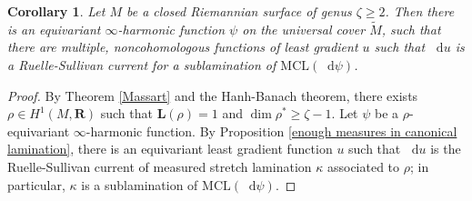 \documentclass[reqno,11pt]{amsart}
\newcommand{\RR}{\mathbf{R}}
\newcommand{\Sph}{\mathbf S}
\newcommand*\dif{\mathop{}\!\mathrm{d}}
\newcommand{\vol}{\mathrm{vol}}
\newcommand{\MCL}{\mathrm{MCL}}
\newcommand{\Mass}{\mathbf M}
\newcommand{\Comass}{\mathbf L}
\newtheorem{corollary}[theorem]{Corollary}
\theoremstyle{definition}
\numberwithin{equation}{section}
\begin{document}
\begin{corollary}
Let $M$ be a closed Riemannian surface of genus $\zeta \geq 2$.
Then there is an equivariant $\infty$-harmonic function $\psi$ on the universal cover $\tilde M$, such that there are multiple, noncohomologous functions of least gradient $u$ such that $\dif u$ is a Ruelle-Sullivan current for a sublamination of $\MCL(\dif \psi)$.
\end{corollary}
\begin{proof}
By Theorem \ref{Massart} and the Hanh-Banach theorem, there exists $\rho \in H^1(M, \RR)$ such that $\Comass(\rho) = 1$ and $\dim \rho^* \geq \zeta - 1$.
Let $\psi$ be a $\rho$-equivariant $\infty$-harmonic function.
By Proposition \ref{enough measures in canonical lamination}, there is an equivariant least gradient function $u$ such that $\dif u$ is the Ruelle-Sullivan current of measured stretch lamination $\kappa$ associated to $\rho$; in particular, $\kappa$ is a sublamination of $\MCL(\dif \psi)$.
\end{proof}


\end{document}
